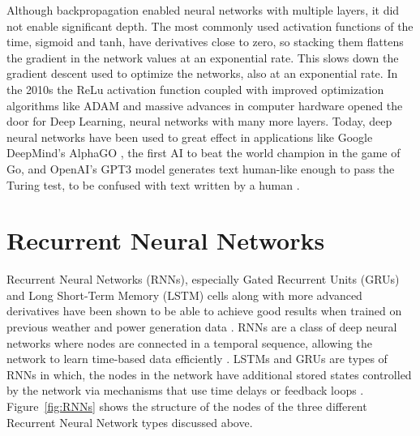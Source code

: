 Although backpropagation enabled neural networks with multiple layers, it did not enable significant depth. The most commonly used activation functions of the time, sigmoid and tanh, have derivatives close to zero, so stacking them flattens the gradient in the network values at an exponential rate. This slows down the gradient descent used to optimize the networks, also at an exponential rate. In the 2010s the ReLu activation function \cite{nair_rectified_2010} coupled with improved optimization algorithms like ADAM \cite{kingma_adam_2014} and massive advances in computer hardware opened the door for Deep Learning, neural networks with many more layers. Today, deep neural networks have been used to great effect in applications like Google DeepMind's AlphaGO \cite{silver_mastering_2016}, the first AI to beat the world champion in the game of Go, and OpenAI's GPT3 model generates text human-like enough to pass the Turing test, to be confused with text written by a human \cite{vandeput_brief_nodate}.


\section{Recurrent Neural Networks\label{cha:RNN}}
Recurrent Neural Networks (RNNs), especially Gated Recurrent Units (GRUs) \cite{cho_properties_2014} and Long Short-Term Memory (LSTM) cells \cite{hochreiter_long_1997, Goodfellow-et-al-2016} along with more advanced derivatives have been shown to be able to achieve good results when trained on previous weather and power generation data \cite{lin_temporal_2020, lee_forecasting_2018, jaidee_very_2019, su_machine_2019}.
RNNs are a class of deep neural networks where nodes are connected in a temporal sequence, allowing the network to learn time-based data efficiently \cite{lim_time_2021}. LSTMs and GRUs are types of RNNs in which, the nodes in the network have additional stored states controlled by the network via mechanisms that use time delays or feedback loops \cite{Goodfellow-et-al-2016, noauthor_recurrent_2021}. Figure~\ref{fig:RNNs} shows the structure of the nodes of the three different Recurrent Neural Network types discussed above.

